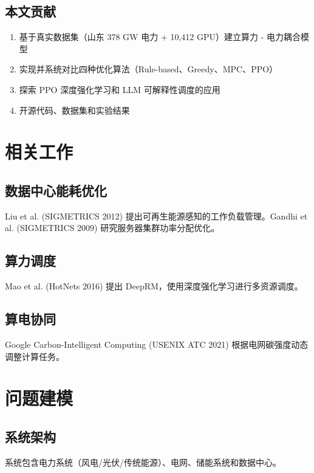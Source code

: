 \documentclass[12pt,a4paper]{article}
\begin{document}
\subsection{本文贡献}

\begin{enumerate}
    \item 基于真实数据集（山东 378 GW 电力 + 10,412 GPU）建立算力 - 电力耦合模型
    \item 实现并系统对比四种优化算法（Rule-based、Greedy、MPC、PPO）
    \item 探索 PPO 深度强化学习和 LLM 可解释性调度的应用
    \item 开源代码、数据集和实验结果
\end{enumerate}

\section{相关工作}
\label{sec:related}

\subsection{数据中心能耗优化}

Liu et al. (SIGMETRICS 2012) 提出可再生能源感知的工作负载管理。Gandhi et al. (SIGMETRICS 2009) 研究服务器集群功率分配优化。

\subsection{算力调度}

Mao et al. (HotNets 2016) 提出 DeepRM，使用深度强化学习进行多资源调度。

\subsection{算电协同}

Google Carbon-Intelligent Computing (USENIX ATC 2021) 根据电网碳强度动态调整计算任务。

\section{问题建模}
\label{sec:model}

\subsection{系统架构}

系统包含电力系统（风电/光伏/传统能源）、电网、储能系统和数据中心。
\end{document}
